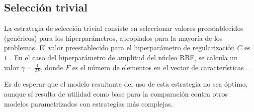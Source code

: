 %
%
\subsection{Selección trivial}
%
La estrategia de selección trivial consiste en seleccionar valores
preestablecidos (genéricos) para los hiperparámetros, apropiados para
la mayoría de los problemas.
El valor preestablecido para el hiperparámetro de regularización $C$
es $1$ \cite{libsvm}.
En el caso del hiperparámetro de amplitud del núcleo RBF, se calcula
un valor $\gamma=\frac{1}{2F}$, donde $F$ es el número de elementos en
el vector de características \cite{glasmachersigel}.

Es de esperar que el modelo resultante del uso de esta estrategia no
sea óptimo, aunque sí resulta de utilidad como base para la
comparación contra otros modelos parametrizados con estrategias más
complejas.
